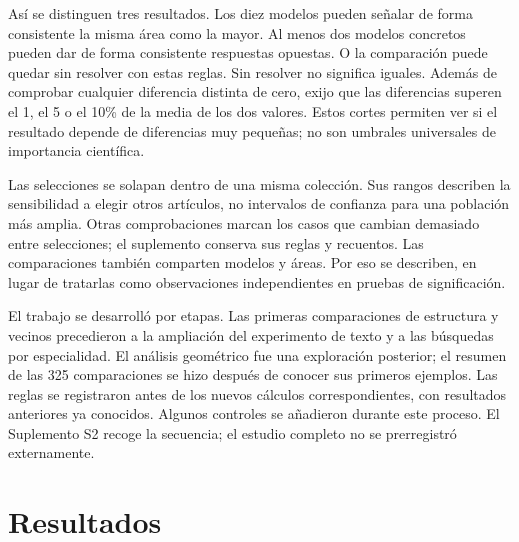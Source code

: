 \documentclass[12pt]{article}
\begin{document}
Así se distinguen tres resultados. Los diez modelos pueden señalar de forma consistente la misma área como la mayor. Al menos dos modelos concretos pueden dar de forma consistente respuestas opuestas. O la comparación puede quedar sin resolver con estas reglas. Sin resolver no significa iguales. Además de comprobar cualquier diferencia distinta de cero, exijo que las diferencias superen el 1, el 5 o el 10\% de la media de los dos valores. Estos cortes permiten ver si el resultado depende de diferencias muy pequeñas; no son umbrales universales de importancia científica.

Las selecciones se solapan dentro de una misma colección. Sus rangos describen la sensibilidad a elegir otros artículos, no intervalos de confianza para una población más amplia. Otras comprobaciones marcan los casos que cambian demasiado entre selecciones; el suplemento conserva sus reglas y recuentos. Las comparaciones también comparten modelos y áreas. Por eso se describen, en lugar de tratarlas como observaciones independientes en pruebas de significación.

El trabajo se desarrolló por etapas. Las primeras comparaciones de estructura y vecinos precedieron a la ampliación del experimento de texto y a las búsquedas por especialidad. El análisis geométrico fue una exploración posterior; el resumen de las 325 comparaciones se hizo después de conocer sus primeros ejemplos. Las reglas se registraron antes de los nuevos cálculos correspondientes, con resultados anteriores ya conocidos. Algunos controles se añadieron durante este proceso. El Suplemento S2 recoge la secuencia; el estudio completo no se prerregistró externamente.

\section{Resultados}
\FloatBarrier
\end{document}
